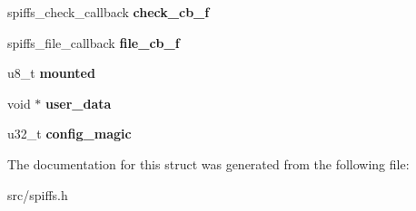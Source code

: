 \begin{DoxyCompactItemize}
\item 
\mbox{\label{structspiffs__t_a5eb5f40440f41dfca5e0a3aba520e4b4}} 
spiffs\+\_\+check\+\_\+callback {\bfseries check\+\_\+cb\+\_\+f}
\item 
\mbox{\label{structspiffs__t_ab3da90414142391c3eeeb5905b7eb30b}} 
spiffs\+\_\+file\+\_\+callback {\bfseries file\+\_\+cb\+\_\+f}
\item 
\mbox{\label{structspiffs__t_a542d258081a8be645319ff597cfcedd4}} 
u8\+\_\+t {\bfseries mounted}
\item 
\mbox{\label{structspiffs__t_a00dfd42d670514d50b7a906b75e45a44}} 
void $\ast$ {\bfseries user\+\_\+data}
\item 
\mbox{\label{structspiffs__t_acaf98085b60c8f1a916bb4023a2bd3be}} 
u32\+\_\+t {\bfseries config\+\_\+magic}
\end{DoxyCompactItemize}


The documentation for this struct was generated from the following file\+:\begin{DoxyCompactItemize}
\item 
src/spiffs.\+h\end{DoxyCompactItemize}
